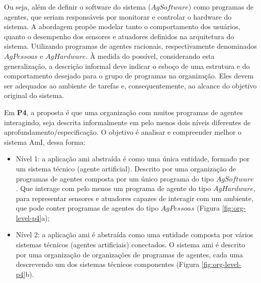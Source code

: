     \begin{figure}[h!]
        \centering
    \end{figure}
    
    Ou seja, além de definir o software do sistema ($AgSoftware$) como programas de agentes, que seriam responsáveis por monitorar e controlar o hardware do sistema. A abordagem propõe modelar tanto o comportamento dos usuários, quanto o desempenho dos sensores e atuadores definidos na arquitetura do sistema. Utilizando programas de agentes racionais, respectivamente denominados $AgPessoas$ e $AgHardware$. À medida do possível, considerando esta generalização, a descrição informal deve indicar o esboço de uma estrutura e do comportamento desejado para o grupo de programas na organização. Eles devem ser adequados ao ambiente de tarefas e, consequentemente, ao alcance do objetivo original do sistema.
    
    Em \textbf{P4}, a proposta é que uma organização com muitos programas de agentes interagindo, seja descrita informalmente em pelo menos dois níveis diferentes de aprofundamento/especificação. O objetivo é analisar e compreender melhor o sistema AmI, dessa forma: 
    
    \begin{itemize}
        
        \item Nível 1: a aplicação \acrshort{ami} abstraída é como uma única entidade, formado por um sistema técnico (agente artificial). Descrito por uma organização de programas de agentes composta por um único programa do tipo $AgSoftware$ . Que interage com pelo menos um programa de agente do tipo $AgHardware$, para representar sensores e atuadores capazes de interagir com um ambiente, que pode conter programas de agentes do tipo $AgPessoas$ (Figura \ref{fig:org-level-p4}a); 
        
        \item Nível 2:  a aplicação \acrshort{ami} é abstraída como uma entidade composta por vários sistemas técnicos (agentes artificiais) conectados. O sistema \acrshort{ami} é descrito por uma organização de organizações de programas de agentes, cada uma descrevendo um dos sistemas técnicos componentes (Figura \ref{fig:org-level-p4}b). 
    
    \end{itemize}
    
